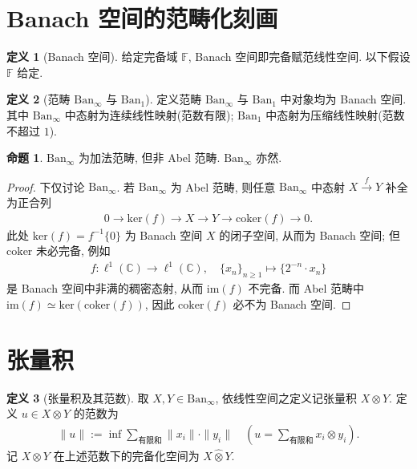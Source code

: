 \documentclass{MainStyle}
\theoremstyle{definition}
\theoremstyle{definition}
\theoremstyle{definition}
\newtheorem{definition}{定义}
\theoremstyle{definition}
\newtheorem{proposition}{命题}
\theoremstyle{definition}
\theoremstyle{definition}
\theoremstyle{definition}
\theoremstyle{remark}
\theoremstyle{remark}
\begin{document}
\maketitle
\section{Banach 空间的范畴化刻画}

\begin{definition}[Banach 空间]
    给定完备域 $\mathbb F$, Banach 空间即完备赋范线性空间. 以下假设 $\mathbb F$ 给定.
\end{definition}

\begin{definition}[范畴 $\mathrm{Ban}_\infty$ 与 $\mathrm{Ban}_1$]
    定义范畴 $\mathrm{Ban}_\infty$ 与 $\mathrm{Ban}_1$ 中对象均为 Banach 空间. 其中 $\mathrm{Ban}_\infty$ 中态射为连续线性映射(范数有限); $\mathrm{Ban}_1$ 中态射为压缩线性映射(范数不超过 $1$).
\end{definition}

\begin{proposition}
    $\mathrm{Ban}_\infty$ 为加法范畴, 但非 Abel 范畴. $\mathrm{Ban}_\infty$ 亦然.
    \begin{proof}
        下仅讨论 $\mathrm{Ban}_\infty$. 若 $\mathrm{Ban}_\infty$ 为 Abel 范畴, 则任意 $\mathrm{Ban}_\infty$ 中态射 $X\overset f\to Y$ 补全为正合列
        \begin{align*}
            0\to \mathrm{ker}(f)\to X\to Y\to \mathrm{coker}(f)\to 0.
        \end{align*}
        此处 $\mathrm{ker}(f)=f^{-1}\{0\}$ 为 Banach 空间 $X$ 的闭子空间, 从而为 Banach 空间; 但 $\mathrm{coker}$ 未必完备, 例如
        \begin{align*}
            f:\ell^1(\mathbb C)\to \ell^1(\mathbb C),\quad \{x_n\}_{n\geq 1}\mapsto \{2^{-n}\cdot x_n\}
        \end{align*}
        是 Banach 空间中非满的稠密态射, 从而 $\mathrm{im}(f)$ 不完备. 而 Abel 范畴中 $\mathrm{im}(f)\simeq \mathrm{ker}(\mathrm{coker}(f))$, 因此 $\mathrm{coker}(f)$ 必不为 Banach 空间.
    \end{proof}
\end{proposition}

\section{张量积}

\begin{definition}[张量积及其范数]
    取 $X,Y\in \mathrm{Ban}_\infty$, 依线性空间之定义记张量积 $X\otimes Y$. 定义 $u\in X\otimes Y$ 的范数为
    \begin{align*}
        \|u\|:=\inf\sum_{\text{有限和}}\|x_i\|\cdot \|y_i\|\quad \left(u=\sum_{\text{有限和}} x_i\otimes y_i\right).
    \end{align*}
    记 $X\otimes Y$ 在上述范数下的完备化空间为 $X\hat \otimes Y$.
\end{definition}
\end{document}
